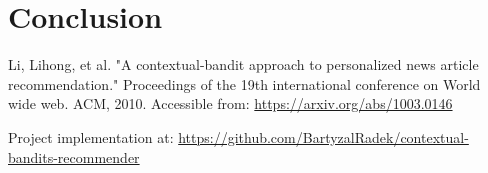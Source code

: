 \documentclass[12pt, titlepage]{article}
\begin{document}
\section{Conclusion}\label{sec:conclusion}


\begin{thebibliography}{0}

   Li, Lihong, et al. "A contextual-bandit approach to personalized news article recommendation." Proceedings of the 19th international conference on World wide web. ACM, 2010. Accessible from: \url{https://arxiv.org/abs/1003.0146}
  
   Project implementation at: \url{https://github.com/BartyzalRadek/contextual-bandits-recommender}
  

\end{thebibliography}
\end{document}

